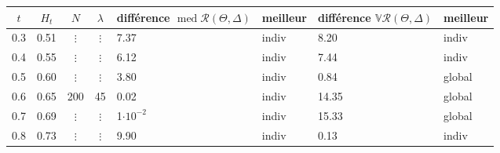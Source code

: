 \begin{tabularx}{\textwidth}{ccccXXXX}
	\toprule
	$t$ & $H_t$ & $N$      & $\lambda$ & différence $\operatorname{med} \mathcal R(\Theta, \Delta)$ & \textbf{meilleur} & différence  $\mathds V \mathcal R(\Theta, \Delta)$ & \textbf{meilleur} \\
	\midrule

	0.3 & 0.51  & $\vdots$ & $\vdots$  & 7.37                                                       & indiv             & 8.20                                               & indiv             \\
	0.4 & 0.55  & $\vdots$ & $\vdots$  & 6.12                                                       & indiv             & 7.44                                               & indiv             \\
	0.5 & 0.60  & $\vdots$ & $\vdots$  & 3.80                                                       & indiv             & 0.84                                               & global            \\
	0.6 & 0.65  & 200      & 45        & 0.02                                                       & indiv             & 14.35                                              & global            \\
	0.7 & 0.69  & $\vdots$ & $\vdots$  & 1$\cdot 10^{-2}$                                           & indiv             & 15.33                                              & global            \\
	0.8 & 0.73  & $\vdots$ & $\vdots$  & 9.90                                                       & indiv             & 0.13                                               & indiv             \\

	\midrule


\end{tabularx}
